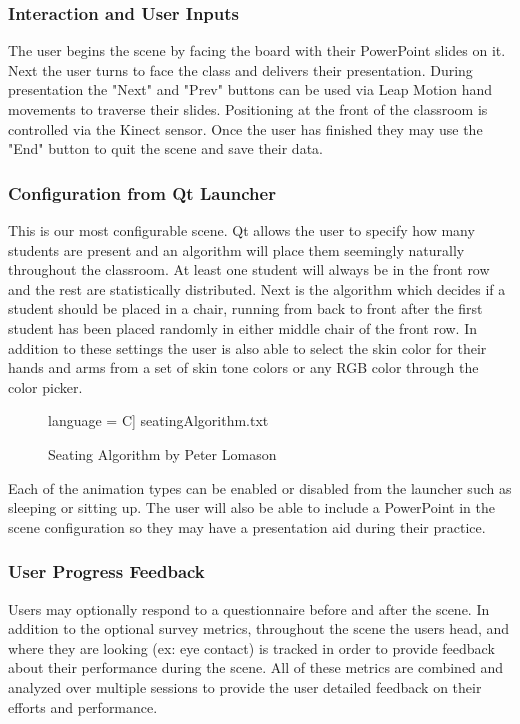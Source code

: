 \documentclass[a4paper,10pt]{article}
\begin{document}
\subsubsection{Interaction and User Inputs}
The user begins the scene by facing the board with their PowerPoint slides on it. Next the user turns to face the class and delivers their presentation. During presentation the "Next" and "Prev" buttons can be used via Leap Motion hand movements to traverse their slides. Positioning at the front of the classroom is controlled via the Kinect sensor. Once the user has finished they may use the "End" button to quit the scene and save their data.

\subsubsection{Configuration from Qt Launcher}
This is our most configurable scene. Qt allows the user to specify how many students are present and an algorithm will place them seemingly naturally throughout the classroom. At least one student will always be in the front row and the rest are statistically distributed. Next is the algorithm which decides if a student should be placed in a chair, running from back to front after the first student has been placed randomly in either middle chair of the front row.  In addition to these settings the user is also able to select the skin color for their hands and arms from a set of skin tone colors or any RGB color through the color picker.

\begin{figure}[H]
	 language = C] {seatingAlgorithm.txt}
	\caption{Seating Algorithm by Peter Lomason}
	\label{code:seatingCode}
\end{figure}

Each of the animation types can be enabled or disabled from the launcher such as sleeping or sitting up. The user will also be able to include a PowerPoint in the scene configuration so they may have a presentation aid during their practice.

\subsubsection{User Progress Feedback}
Users may optionally respond to a questionnaire before and after the scene. In addition to the optional survey metrics, throughout the scene the users head, and where they are looking (ex: eye contact) is tracked in order to provide feedback about their performance during the scene. All of these metrics are combined and analyzed over multiple sessions to provide the user detailed feedback on their efforts and performance. 
\end{document}
